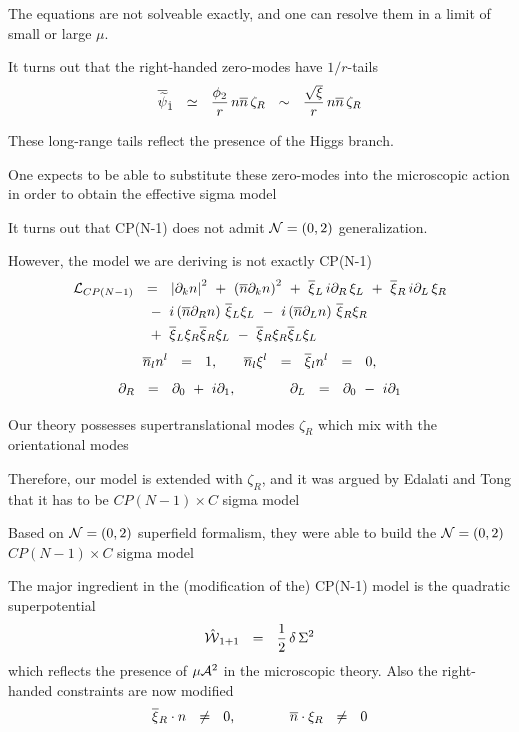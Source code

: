 \documentclass[12pt,letterpaper,landscape,KOMA,smallheadings,calcdimensions,display]{powersem}
\newcommand{\bxir}{\ov{\xi}{}_R}
\newcommand{\bxil}{\ov{\xi}{}_L}
\newcommand{\xir}{\xi_R}
\newcommand{\xil}{\xi_L}
\newcommand{\zr}{\zeta_R}
\newcommand{\nbar}{\ov{n}}
\begin{document}
\begin{slide}
	The equations are not solveable exactly, and one can resolve them in 
	a limit of small or large $ \mu $. 

	It turns out that the right-handed zero-modes have $ 1/r $-tails
\[
	\ov{\wt{\psi}}{}_{\dot{1}}  ~~\simeq~~  \frac{\phi_2}{r}\, n\nbar\, \zr  ~~\sim~~ \frac{\sqrt{\xi}}{r}\, n\nbar\, \zr
\]

	These long-range tails reflect the presence of the Higgs branch.

	One expects to be able to substitute these zero-modes into the microscopic action in order to 
	obtain the effective sigma model
\end{slide}

\begin{slide}
	It turns out that CP(N-1) does not admit $\mathcal{N}=(0,2)$ generalization.

	However, the model we are deriving is not exactly CP(N-1)
\begin{align*}
	\mc{L}_{CP(N-1)} & ~~=~~ 
		\left|\p_k n \right|^2  ~+~ \left(\ov{n}\p_k n\right)^2  
		~+~ \ov{\xi}{}_L\, i\p_R\, \xi_L  ~+~ \ov{\xi}{}_R\, i\p_L\,  \xi_R 
	\\
%
	&
	~~~-~
	i \left(\nbar\p_R n\right)\, \bxil\xil ~-~ i \left(\nbar\p_Ln\right) \, \bxir\xir 
	\\
%
	&
	~~~+~
		\bxil \xir \bxir \xil ~-~ \bxir \xir \bxil \xil
\end{align*}
\[
	\nbar{}_l n^l ~~=~~ 1\text, \qquad \nbar_l \xi^l ~~=~~ \ov{\xi}{}_l n^l ~~=~~ 0\text,
\]
\[
	\partial_R ~~=~~ \partial_0 ~+~ i\partial_1 \text, \qquad\qquad \partial_L ~~=~~ \partial_0 ~-~ i\partial_1
\]

	Our theory possesses supertranslational modes $ \zr $ which mix with the orientational
	modes
\end{slide}

\begin{slide}
	Therefore, our model is extended with $ \zr $, and it was argued by Edalati and Tong that
	it has to be $ CP(N-1) \times C $ sigma model

	Based on $\mathcal{N}=(0,2)$ superfield formalism, they were able to build the $\mathcal{N}=(0,2) $
	$ CP(N-1) \times C $ sigma model

	The major ingredient in the (modification of the) CP(N-1) model is the quadratic superpotential
\[
	\hat{\mathcal{W}}{}_{1+1}  ~~=~~ \frac{1}{2} \, \delta \, \Sigma^2
\]
	which reflects the presence of $ \mu\mathcal{A}^2 $ in the microscopic theory.
	Also the right-handed constraints are now modified
\[
	\bxir \cdot n   ~~\neq~~ 0 \text, \qquad\qquad  \nbar \cdot \xir ~~\neq~~0
\]
\end{slide}
\end{document}
